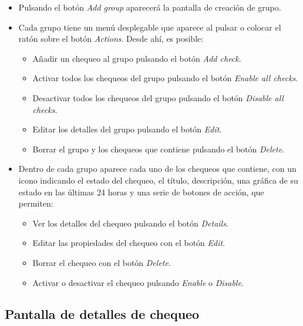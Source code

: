 \begin{itemize}
\item Pulsando el botón \textit{Add group} aparecerá la pantalla de creación de
  grupo.
\item Cada grupo tiene un menú desplegable que aparece al pulsar o colocar el
  ratón sobre el botón \textit{Actions}. Desde ahí, es posible:
  \begin{itemize}
  \item Añadir un chequeo al grupo pulsando el botón \textit{Add check}.
  \item Activar todos los chequeos del grupo pulsando el botón \textit{Enable
      all checks}.
  \item Desactivar todos los chequeos del grupo pulsando el botón
    \textit{Disable all checks}.
  \item Editar los detalles del grupo pulsando el botón \textit{Edit}.
  \item Borrar el grupo y los chequeos que contiene pulsando el botón \textit{Delete}.
  \end{itemize}
\item Dentro de cada grupo aparece cada uno de los chequeos que contiene, con un
  icono indicando el estado del chequeo, el título, descripción, una gráfica de
  su estado en las últimas 24 horas y una serie de botones de acción, que
  permiten:
  \begin{itemize}
  \item Ver los detalles del chequeo pulsando el botón \textit{Details}.
  \item Editar las propiedades del chequeo con el botón \textit{Edit}.
  \item Borrar el chequeo con el botón \textit{Delete}.
  \item Activar o desactivar el chequeo pulsando \textit{Enable} o
    \textit{Disable}.
  \end{itemize}

\end{itemize}

\subsection{Pantalla de detalles de chequeo}


